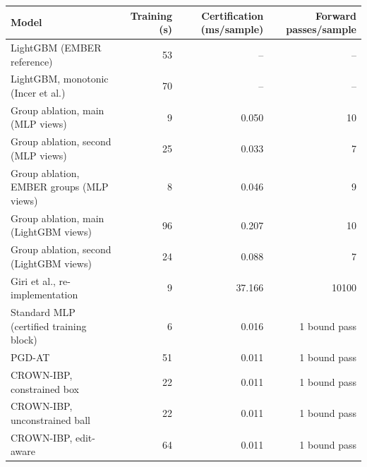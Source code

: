 \begin{tabular}{lrrr}
\toprule
Model & Training (s) & Certification (ms/sample) & Forward passes/sample \\
\midrule
LightGBM (EMBER reference) & 53 & -- & -- \\
LightGBM, monotonic (Incer et al.) & 70 & -- & -- \\
Group ablation, main (MLP views) & 9 & 0.050 & 10 \\
Group ablation, second (MLP views) & 25 & 0.033 & 7 \\
Group ablation, EMBER groups (MLP views) & 8 & 0.046 & 9 \\
Group ablation, main (LightGBM views) & 96 & 0.207 & 10 \\
Group ablation, second (LightGBM views) & 24 & 0.088 & 7 \\
Giri et al., re-implementation & 9 & 37.166 & 10100 \\
Standard MLP (certified training block) & 6 & 0.016 & 1 bound pass \\
PGD-AT & 51 & 0.011 & 1 bound pass \\
CROWN-IBP, constrained box & 22 & 0.011 & 1 bound pass \\
CROWN-IBP, unconstrained ball & 22 & 0.011 & 1 bound pass \\
CROWN-IBP, edit-aware & 64 & 0.011 & 1 bound pass \\
\bottomrule
\end{tabular}
